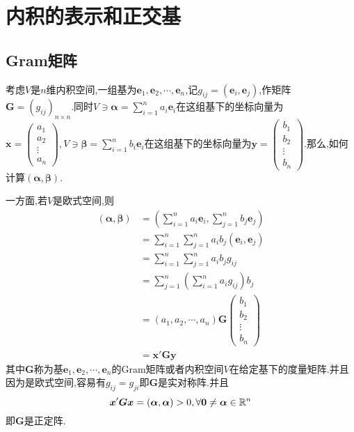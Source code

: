 \newpage
\section{内积的表示和正交基}
\subsection{Gram矩阵}
考虑$V$是$n$维内积空间,一组基为$\bm{e}_1,\bm{e}_2,\cdots,\bm{e}_n$,记$g_{ij}=\left(\bm{e}_i,\bm{e}_j\right)$,作矩阵$\bm{G}=\left(g_{ij}\right)_{n\times n}$.同时$\displaystyle V\ni\bm{\alpha}=\sum_{i=1}^{n}a_i\bm{e}_i$在这组基下的坐标向量为$\displaystyle\bm{x}=\begin{pmatrix}
        a_1 \\a_2\\\vdots\\a_n
    \end{pmatrix},V\ni\bm{\beta}=\sum_{i=1}^{n}b_i\bm{e}_i$在这组基下的坐标向量为$\displaystyle\bm{y}=\begin{pmatrix}
        b_1 \\b_2\\\vdots\\b_n
    \end{pmatrix}$.那么,如何计算$\left(
    \bm{\alpha},\bm{\beta}
    \right)$.

一方面,若$V$是欧式空间,则\begin{align*}
    \left(
    \bm{\alpha},\bm{\beta}
    \right) & =\left(
    \sum_{i=1}^{n}a_i\bm{e}_i,\sum_{j=1}^{n}b_j\bm{e}_j
    \right)                                             \\
            & =\sum_{i=1}^{n}\sum_{j=1}^{n}a_ib_j\left(
    \bm{e}_i,\bm{e}_j
    \right)                                             \\
            & =\sum_{i=1}^{n}\sum_{j=1}^{n}a_ib_jg_{ij} \\
            & =\sum_{j=1}^{n}\left(
    \sum_{i=1}^{n}a_ig_{ij}
    \right)b_j                                          \\
            & =\left(
    a_1,a_2,\cdots,a_n
    \right)\bm{G}\begin{pmatrix}
                     b_1 \\b_2\\\vdots\\b_n
                 \end{pmatrix}                  \\
            & =\bm{x}'\bm{G}\bm{y}
\end{align*}其中$\bm{G}$称为基$\bm{e}_1,\bm{e}_2,\cdots,\bm{e}_n$的Gram矩阵或者内积空间$V$在给定基下的度量矩阵.并且因为是欧式空间,容易有$g_{ij}=g_{ji}$即$\bm{G}$是实对称阵.并且\[
    \bm{x}'\bm{Gx}=\left(
    \bm{\alpha},\bm{\alpha}
    \right)>0,\forall\bm{0}\neq\bm{\alpha}\in \mathbb{R} ^n
\]即$\bm{G}$是正定阵.

